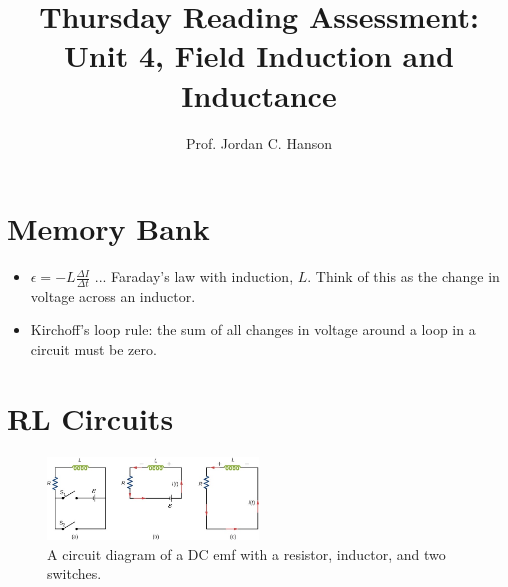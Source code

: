 \documentclass{article}
\begin{document}
\title{Thursday Reading Assessment: Unit 4, Field Induction and Inductance}
\author{Prof. Jordan C. Hanson}

\maketitle

\section{Memory Bank}

\begin{itemize}
\item $\epsilon = -L \frac{\Delta I}{\Delta t}$ ... Faraday's law with induction, $L$.  Think of this as the change in voltage across an inductor.
\item Kirchoff's loop rule: the sum of all changes in voltage around a loop in a circuit must be zero.
\end{itemize}

\section{RL Circuits}

\begin{figure}
\centering
\includegraphics[width=0.5\textwidth]{rl.jpeg}
\caption{\label{fig:rl} A circuit diagram of a DC emf with a resistor, inductor, and two switches.}
\end{figure}
\end{document}
